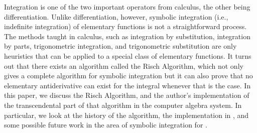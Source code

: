 Integration is one of the two important operators from calculus, the
other being differentiation.  Unlike differentiation, however, symbolic
integration (i.e., indefinite integration) of elementary functions is
not a straightforward process. The methods taught in calculus, such as
integration by substitution, integration by parts, trigonometric
integration, and trigonometric substitution are only heuristics that can
be applied to a special class of elementary functions. It turns out that
there exists an algorithm called the Risch Algorithm, which not only
gives a complete algorithm for symbolic integration but it can also
prove that no elementary antiderivative can exist for the integral
whenever that is the case. In this paper, we discuss the Risch
Algorithm, and the author's implementation of the transcendental part of
that algorithm in the \sympy computer algebra system.  In particular, we
look at the history of the algorithm, the implementation in \SymPy, and
some possible future work in the area of symbolic integration for \SymPy.
